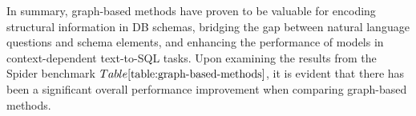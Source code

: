 \begin{table}[t]
  \centering
  \caption{The exact match accuracy on the Spider dev set.}
  \label{table:graph-based-methods}
\end{table}

In summary, graph-based methods have proven to be valuable for encoding structural information in DB schemas, bridging the gap between natural language questions and schema elements, and enhancing the performance of models in context-dependent text-to-SQL tasks. Upon examining the results from the Spider benchmark \(Table\ref{table:graph-based-methods}\), it is evident that there has been a significant overall performance improvement when comparing graph-based methods.